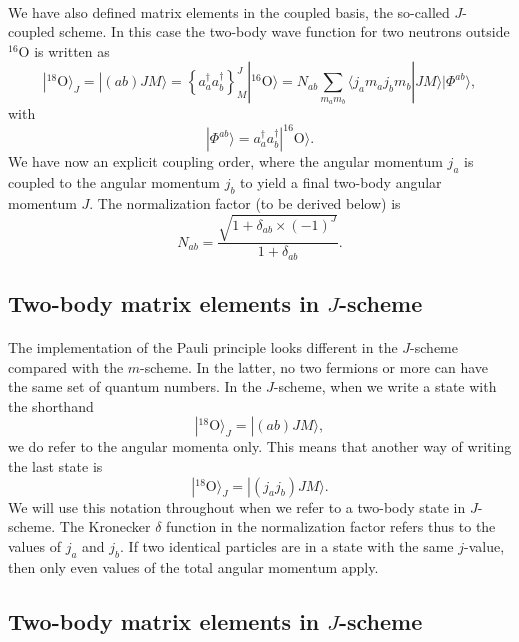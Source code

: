 \documentclass[%
twoside,                 %
final,                   %
10pt]{article}
\begin{document}
\paragraph{}
We have also defined matrix elements in the coupled basis, the so-called $J$-coupled scheme.
In this case the two-body wave function for two neutrons outside ${}^{16}\mbox{O}$ is written as 
\[
|^{18}\mathrm{O}\rangle_J =|(ab)JM\rangle  = \left\{a^{\dagger}_aa^{\dagger}_b\right\}^J_M|^{16}\mathrm{O}\rangle=N_{ab}\sum_{m_am_b}\langle j_am_aj_bm_b|JM\rangle|\Phi^{ab}\rangle, 
\]
with
\[
|\Phi^{ab}\rangle=a^{\dagger}_aa^{\dagger}_b|^{16}\mathrm{O}\rangle.
\]
We have now an explicit coupling order, where the angular momentum $j_a$ is coupled to the angular momentum $j_b$ to yield a final two-body angular momentum $J$. 
The normalization factor (to be derived below) is
\[
N_{ab}=\frac{\sqrt{1+\delta_{ab}\times (-1)^J}}{1+\delta_{ab}}.
\]



\subsection*{Two-body matrix elements in $J$-scheme}

\paragraph{}
The implementation of the Pauli principle looks different in the $J$-scheme compared with the $m$-scheme. In the latter, no two fermions or more can have the same set of quantum numbers. In the $J$-scheme, when we write a state with the shorthand 
\[
|^{18}\mathrm{O}\rangle_J =|(ab)JM\rangle,
\]
we do refer to the angular momenta only. This means that another way of writing the last state is
\[
|^{18}\mathrm{O}\rangle_J =|(j_aj_b)JM\rangle.
\]
We will use this notation throughout when we refer to a two-body state in $J$-scheme. The Kronecker $\delta$ function in the normalization factor 
refers thus to the values of $j_a$ and $j_b$. If two identical particles are in a state with the same $j$-value, then only even values of the total angular momentum apply.




\subsection*{Two-body matrix elements in $J$-scheme}
\end{document}
